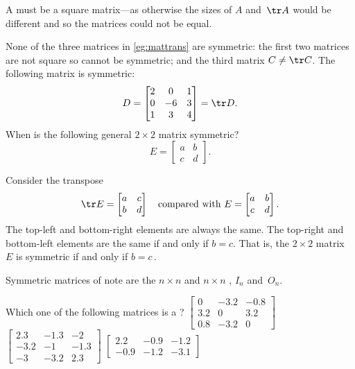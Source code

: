 A  must be a square matrix---as otherwise the sizes of \(A\) and~\(\tr A\) would be different and so the matrices could not be equal.


\begin{example} 
None of the three matrices in \cref{eg:mattrans} are symmetric: the first two matrices are not square so cannot be symmetric; and the third matrix \(C\neq\tr C\).  
The following matrix is symmetric:
\begin{equation*}
D=\begin{bmatrix} 2 & 0 & 1\\ 0 & -6 & 3\\ 1 & 3 & 4  \end{bmatrix}
=\tr D.
\end{equation*}
When is the following general \(2\times2\) matrix symmetric?
\begin{equation*}
E=\begin{bmatrix} a&b\\c&d \end{bmatrix}.
\end{equation*}
\begin{solution} 
Consider the transpose
\begin{equation*}
\tr E=\begin{bmatrix} a&c\\b&d \end{bmatrix}
\quad\text{compared with }
E=\begin{bmatrix} a&b\\c&d \end{bmatrix}.
\end{equation*}
The top-left and bottom-right elements are always the same.
The top-right and bottom-left elements are the same if and only if \(b=c\).
That is, the \(2\times 2\) matrix~\(E\) is symmetric if and only if \(b=c\)\,.
\end{solution}
\end{example}

Symmetric matrices of note are the \(n\times n\)  and \(n\times n\) , \(I_n\) and~\(O_n\).


\begin{activity}
Which one of the following matrices is a ?
{\(\begin{bmatrix} 0&-3.2&-0.8
\\3.2&0&3.2
\\0.8&-3.2&0 \end{bmatrix}\)}
{\(\begin{bmatrix} 2.3&-1.3&-2
\\-3.2&-1&-1.3
\\-3&-3.2&2.3 \end{bmatrix}\)}
{\(\begin{bmatrix} 2.2&-0.9&-1.2
\\-0.9&-1.2&-3.1 \end{bmatrix}\)}
\end{activity}
   



